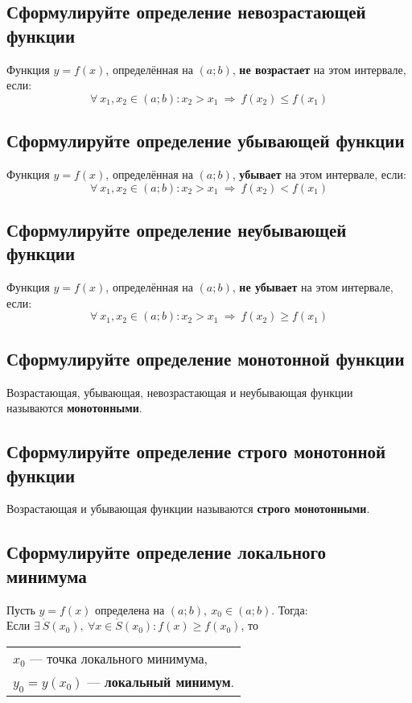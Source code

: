 \subsection{Сформулируйте определение невозрастающей функции}
\begin{definition}
	Функция $y=f(x)$, определённая на $(a;b)$, \textbf{не возрастает} на этом интервале, если:
	\[ \forall\ x_1, x_2 \in (a;b)\colon x_2 > x_1\ \Rightarrow\ f(x_2) \le f(x_1) \]
\end{definition}

\subsection{Сформулируйте определение убывающей функции}
\begin{definition}
	Функция $y=f(x)$, определённая на $(a;b)$, \textbf{убывает} на этом интервале, если: \[ \forall\ x_1, x_2 \in (a;b)\colon x_2 > x_1\ \Rightarrow\ f(x_2) < f(x_1) \]
\end{definition}

\subsection{Сформулируйте определение неубывающей функции}
\begin{definition}
	Функция $y=f(x)$, определённая на $(a;b)$, \textbf{не убывает} на этом интервале, если:
	\[ \forall\ x_1, x_2 \in (a;b)\colon x_2 > x_1\ \Rightarrow\ f(x_2) \ge f(x_1) \]
\end{definition}

\subsection{Сформулируйте определение монотонной функции}
\begin{definition}
    Возрастающая, убывающая, невозрастающая и неубывающая функции называются \textbf{монотонными}.
\end{definition}

\subsection{Сформулируйте определение строго монотонной функции}
\begin{definition}
    Возрастающая и убывающая функции называются \textbf{строго монотонными}.
\end{definition}

\subsection{Сформулируйте определение локального минимума}
\begin{definition}
	Пусть $y=f(x)$ определена на $(a;b),\ x_0 \in (a;b)$. Тогда:\\[1ex]
	Если $\exists\ \mathring{S}(x_0),\ \forall x \in \mathring{S}(x_0)\colon f(x) \ge f(x_0)$, то \begin{tabular}{l} $x_0$ --- точка локального минимума, \\ $y_0 = y(x_0)$ --- \textbf{локальный минимум}. \end{tabular}
\end{definition}

